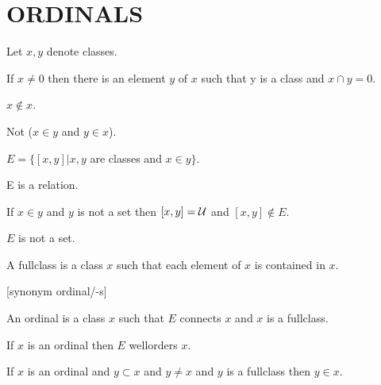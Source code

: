 \documentclass[a4paper,draft]{amsproc}
\begin{document}
\section{ORDINALS}
\begin{forthel}

Let $x, y$ denote classes.
\begin{axiom}
If $x \neq 0$ then there is an element $y$ of $x$ such that y is a class and $x \cap y = 0$.
\end{axiom}

\begin{theorem}[101]
$x \notin x$.
\end{theorem}

\begin{theorem}[102]
Not ($x \in y$ and $y \in x$).
\end{theorem}

\begin{definition}[103]
$E = \{[x,y] | x,y$ are classes and $x \in y\}$.
\end{definition}

\begin{lemma}
E is a relation.
\end{lemma}

\begin{lemma}
If $x \in y$ and $y$ is not a set then $[x,y] = \cal{U}$ and $[x,y] \notin E$.
\end{lemma}

\begin{theorem}[104]
$E$ is not a set.
\end{theorem}

\begin{definition}[105]
A fullclass is a class $x$ such that each element of $x$ is contained in $x$.
\end{definition}

[synonym ordinal/-s]
\begin{definition}[106]
An ordinal is a class $x$ such that $E$ connects $x$ and $x$ is a fullclass.
\end{definition}

\begin{theorem}[107]
If $x$ is an ordinal then $E$ wellorders $x$.
\end{theorem}

\begin{theorem}[108]
If $x$ is an ordinal and $y \subset x$ and $y \neq x$ and $y$ is a fullclass then $y \in x$.
\end{theorem}


\end{forthel}
\end{document}
